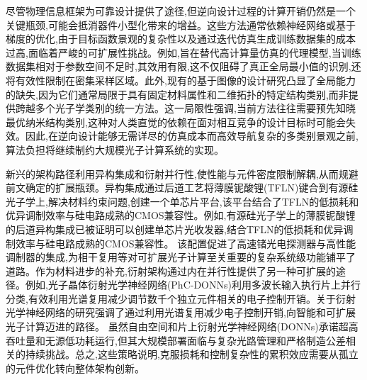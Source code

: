 尽管物理信息框架为可靠设计提供了途径,但逆向设计过程的计算开销仍然是一个关键瓶颈,可能会抵消器件小型化带来的增益。这些方法通常依赖神经网络或基于梯度的优化,由于目标函数景观的复杂性以及通过迭代仿真生成训练数据集的成本过高,面临着严峻的可扩展性挑战。例如,旨在替代高计算量仿真的代理模型,当训练数据集相对于参数空间不足时,其效用有限,这不仅阻碍了真正全局最小值的识别,还将有效性限制在密集采样区域。此外,现有的基于图像的设计研究凸显了全局能力的缺失,因为它们通常局限于具有固定材料属性和二维拓扑的特定结构类别,而非提供跨越多个光子学类别的统一方法。这一局限性强调,当前方法往往需要预先知晓最优纳米结构类别,这种对人类直觉的依赖在面对相互竞争的设计目标时可能会失效。因此,在逆向设计能够无需详尽的仿真成本而高效导航复杂的多类别景观之前,算法负担将继续制约大规模光子计算系统的实现。\citep{doi_10_1109_cleo_europe_eqec65582_2025_11110329_26a41a7d} \citep{doi_10_1002_adom_202100548_6789fa4c}

新兴的架构路径利用异构集成和衍射并行性,使性能与元件密度限制解耦,从而规避前文确定的扩展瓶颈。异构集成通过后道工艺将薄膜铌酸锂(TFLN)键合到有源硅光子学上,解决材料约束问题,创建一个单芯片平台,该平台结合了TFLN的低损耗和优异调制效率与硅电路成熟的CMOS兼容性。例如,有源硅光子学上的薄膜铌酸锂的后道异构集成已被证明可以创建单芯片光收发器,结合TFLN的低损耗和优异调制效率与硅电路成熟的CMOS兼容性。\citep{s2_9b444e84d20ae6e3d62d2d4df30268b5a53baad2_40af2cc9} 该配置促进了高速锗光电探测器与高性能调制器的集成,为相干复用等对可扩展光子计算至关重要的复杂系统级功能铺平了道路。作为材料进步的补充,衍射架构通过内在并行性提供了另一种可扩展的途径。例如,光子晶体衍射光学神经网络(PhC-DONNs)利用多波长输入执行片上并行分类,有效利用光谱复用减少调节数千个独立元件相关的电子控制开销。关于衍射光学神经网络的研究强调了通过利用光谱复用减少电子控制开销,向智能和可扩展光子计算迈进的路径。\citep{doi_10_1002_nap2_70098_8d5f2f8a} 虽然自由空间和片上衍射光学神经网络(DONNs)承诺超高吞吐量和无源低功耗运行,但其大规模部署面临与复杂光路管理和严格制造公差相关的持续挑战。总之,这些策略说明,克服损耗和控制复杂性的累积效应需要从孤立的元件优化转向整体架构创新。\citep{s2_9b444e84d20ae6e3d62d2d4df30268b5a53baad2_40af2cc9} \citep{doi_10_1515_nanoph_2025_0168_86a0f7aa} \citep{doi_10_1002_nap2_70098_8d5f2f8a}

